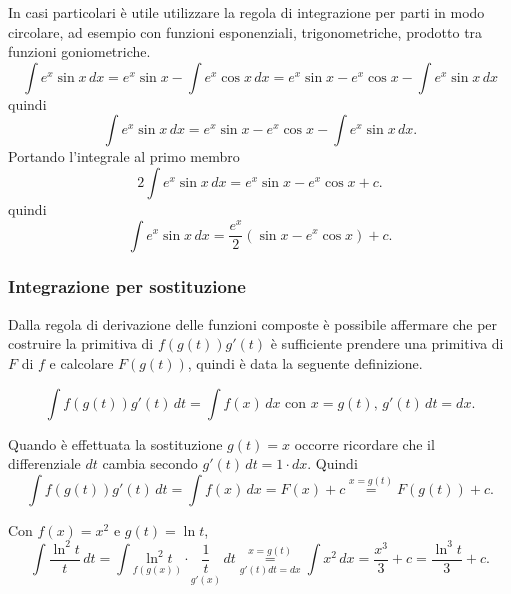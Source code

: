 \begin{example}
    In casi particolari è utile utilizzare la regola di integrazione per parti in modo circolare, ad esempio con funzioni esponenziali, trigonometriche, prodotto tra funzioni goniometriche.
    \begin{equation*}
        \int e^x\sin x\, dx= e^x\sin x - \int e^x \cos x\, dx= e^x\sin x - e^x\cos x - \int e^x \sin x\, dx
    \end{equation*}
    quindi
    \begin{equation*}
        \int e^x\sin x\, dx= e^x\sin x - e^x\cos x - \int e^x \sin x\, dx.
    \end{equation*}
    Portando l'integrale al primo membro
    \begin{equation*}
        2\int e^x\sin x\, dx= e^x\sin x - e^x\cos x + c.
    \end{equation*}
    quindi
    \begin{equation*}
        \int e^x\sin x\, dx= \frac{e^x}{2}(\sin x - e^x\cos x) + c.
    \end{equation*}
\end{example}

\subsubsection{Integrazione per sostituzione}
Dalla regola di derivazione delle funzioni composte è possibile affermare che per costruire la primitiva di $f(g(t))g'(t)$ è sufficiente prendere una primitiva di $F$ di $f$ e calcolare $F(g(t))$, quindi è data la seguente definizione.
\begin{definition}
    \begin{equation*}
        \int f(g(t))g'(t)\, dt= \int f(x)\, dx \text{ con } x=g(t),\, g'(t)\, dt=dx.
    \end{equation*}
\end{definition}

Quando è effettuata la sostituzione $g(t)=x$ occorre ricordare che il differenziale $dt$ cambia secondo $g'(t)\, dt = 1\cdot dx$. Quindi
\begin{equation*}
        \int f(g(t))g'(t)\, dt = \int f(x)\, dx = F(x) + c \overset{x=g(t)}{=}F(g(t)) + c.
\end{equation*}

\begin{example}
    Con $f(x)=x^2$ e $g(t)=\ln t$,
    \begin{equation*}
        \int\frac{\ln^2t}{t}\,dt= \int\underset{f(g(x))}{\ln^2 t}\cdot\underset{g'(x)}{\frac{1}{t}}\, dt \underset{g'(t)dt=dx}{\overset{x=g(t)}{=}}\int x^2\, dx = \frac{x^3}{3}+c = \frac{\ln^3 t}{3}+c.
    \end{equation*}
\end{example}

